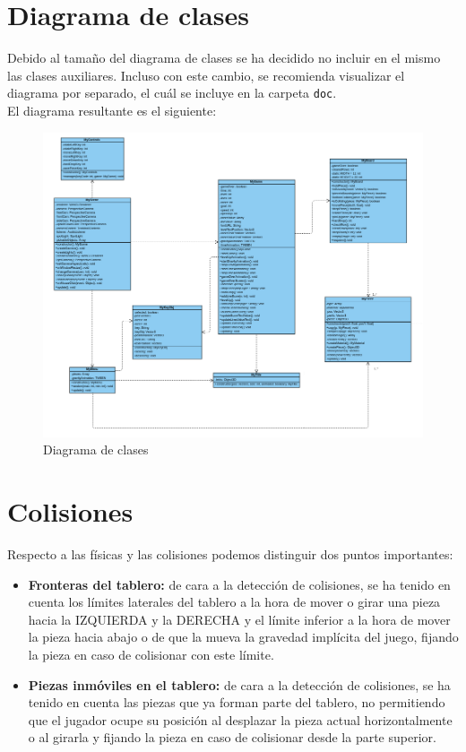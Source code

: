 \documentclass[11pt,a4paper]{article}
\begin{document}
\newpage

\section{Diagrama de clases}

Debido al tamaño del diagrama de clases se ha decidido no incluir en el mismo las clases auxiliares. Incluso con este cambio, se recomienda visualizar el diagrama por separado, el cuál se incluye en la carpeta \texttt{doc}.\\

El diagrama resultante es el siguiente:

\begin{figure}[H]
    \centering
    \includegraphics[scale=0.50]{diagrama.png}
    \caption{Diagrama de clases}
\end{figure}

\newpage

\section{Colisiones}

Respecto a las físicas y las colisiones podemos distinguir dos puntos importantes:
\begin{itemize}
    \item \textbf{Fronteras del tablero:} de cara a la detección de colisiones, se ha tenido en cuenta los límites laterales del tablero a la hora de mover o girar una pieza hacia la IZQUIERDA y la DERECHA y el límite inferior a la hora de mover la pieza hacia abajo o de que la mueva la gravedad implícita del juego, fijando la pieza en caso de colisionar con este límite.
    \item \textbf{Piezas inmóviles en el tablero:} de cara a la detección de colisiones, se ha tenido en cuenta las piezas que ya forman parte del tablero, no permitiendo que el jugador ocupe su posición al desplazar la pieza actual horizontalmente o al girarla y fijando la pieza en caso de colisionar desde la parte superior.
\end{itemize}
\end{document}
